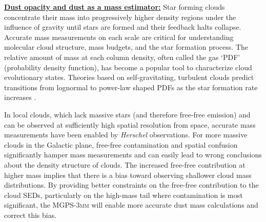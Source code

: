 \documentclass[11pt,preprint]{aastex_nofoot}
\newcommand{\MGPS}{\textsc{MGPS-3mm}\xspace}
\begin{document}
\indent\underline{\textbf{\helv Dust opacity and dust as a mass estimator:}} 
Star forming clouds concentrate their mass into progressively higher density
regions under the influence of gravity until stars are formed and their
feedback halts collapse. Accurate mass measurements on each scale are critical for understanding molecular cloud
structure, mass budgets, and the star formation process.  
The relative amount of mass at each column density, often called the gas `PDF'
(probability density function), has become a popular tool to characterize cloud
evolutionary states.  Theories based on self-gravitating, turbulent clouds
predict transitions from lognormal to power-law shaped PDFs as the star
formation rate increases \citep[e.g.,][]{Burkhart2018a}.


In local clouds, which lack massive stars (and therefore free-free emission)
and can be observed at sufficiently high spatial resolution from space,
accurate mass measurements have been enabled by \textit{Herschel} observations.  For
more massive clouds in the Galactic plane, free-free contamination and spatial
confusion significantly hamper mass measurements and can easily lead to wrong
conclusions about the density structure of clouds.  The increased free-free
contribution at higher mass implies that there is 
a bias toward observing shallower cloud mass distributions.
By providing better constraints on the free-free contribution to the cloud
SEDs,  particularly on the high-mass tail where contamination is most
significant, the \MGPS will enable more accurate dust mass calculations and
correct this bias.

\end{document}
